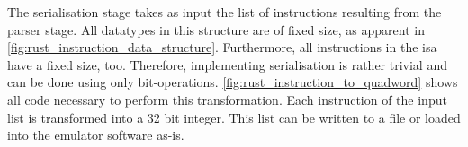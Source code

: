 The serialisation stage takes as input the list of instructions resulting from the parser stage. All datatypes in this structure are of fixed size, as apparent in \autoref{fig:rust_instruction_data_structure}. Furthermore, all instructions in the \ac{isa} have a fixed size, too. Therefore, implementing serialisation is rather trivial and can be done using only bit-operations. \autoref{fig:rust_instruction_to_quadword} shows all code necessary to perform this transformation. Each instruction of the input list is transformed into a 32 bit integer. This list can be written to a file or loaded into the emulator software as-is.